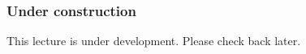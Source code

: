 


	

\begin{frame}
 \frametitle{Under construction}
 
  This lecture is under development. Please check back later.

\end{frame}



